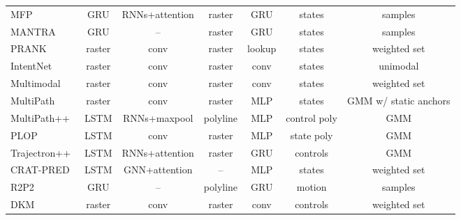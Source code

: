 \begin{table}[h!]
\begin{adjustbox}{max width=\textwidth}
\begin{tabular}{l |ccc|c|c|c}
			MFP~\cite{tang2019multiple}	& GRU	& RNNs+attention	& raster	& GRU	& states	& samples	\\
			MANTRA~\cite{marchetti2020mantra}	& GRU	& --	& raster	& GRU	& states	& samples	\\
			PRANK~\cite{biktairov2020prank}	& raster	& conv	& raster	& lookup	& states	& weighted set	\\
			IntentNet~\cite{casas2018intentnet}	& raster	& conv	& raster	& conv	& states	& unimodal	\\
			Multimodal~\cite{cui2019multimodal}	& raster	& conv	& raster	& conv	& states	& weighted set	\\
			MultiPath~\cite{chai2019multipath}	& raster	& conv	& raster	& MLP	& states	& GMM w/ static anchors	\\
			MultiPath++~\cite{varadarajan2022multipath++}	& LSTM	& RNNs+maxpool	& polyline	& MLP	& control poly	& GMM	\\
			PLOP~\cite{buhet2021plop}	& LSTM	& conv	& raster	& MLP	& state poly	& GMM	\\
			Trajectron++\cite{salzmann2020trajectron++}	& LSTM	& RNNs+attention	& raster	& GRU	& controls	& GMM	\\
			CRAT-PRED\cite{schmidt2022crat}	& LSTM	& GNN+attention	& --	& MLP	& states	& weighted set	\\
			R2P2~\cite{rhinehart2018r2p2}	& GRU	& --	& polyline	& GRU	& motion	& samples	\\
			DKM~\cite{cui2020deep}	& raster	& conv	& raster	& conv	& controls	& weighted set	\\
		\end{tabular}
		\label{table:2_dl_related_work_mp}
	\end{adjustbox}
\end{table}

